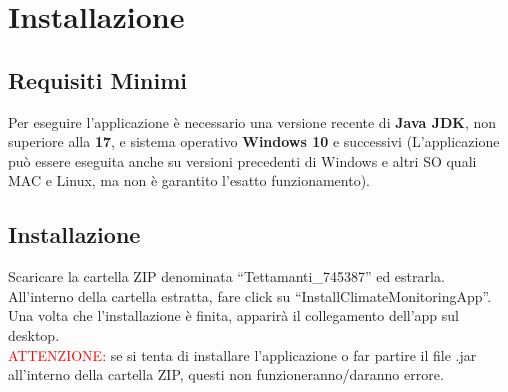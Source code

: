 \NoBgThispage
\section{Installazione}
\subsection{Requisiti Minimi}
Per eseguire l’applicazione è necessario una versione recente di \textbf{Java JDK}, non superiore alla \textbf{17}, e sistema 
operativo \textbf{Windows 10} e successivi (L’applicazione può essere eseguita anche su versioni precedenti di 
Windows e altri SO quali MAC e Linux, ma non è garantito l’esatto funzionamento).

\subsection{Installazione}
Scaricare la cartella ZIP denominata “Tettamanti\_745387” ed estrarla. All’interno della cartella 
estratta, fare click su “InstallClimateMonitoringApp”. Una volta che l’installazione è finita, apparirà
il collegamento dell’app sul desktop.\\
\textcolor{red}{ATTENZIONE}: se si tenta di installare l’applicazione o far partire il file .jar all’interno della cartella 
ZIP, questi non funzioneranno/daranno errore.